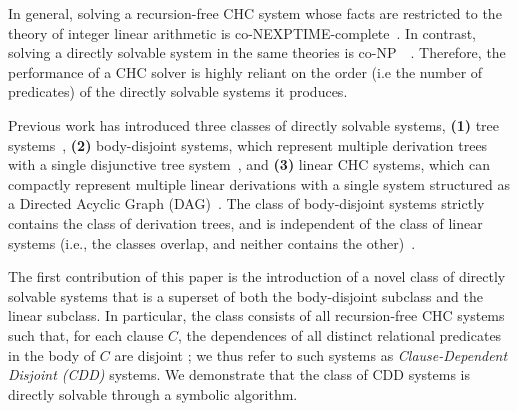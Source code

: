 In general, solving a recursion-free CHC system whose facts are
restricted to the theory of integer linear arithmetic is
co-NEXPTIME-complete~\cite{rummer13b}.
%
In contrast, solving a directly solvable system in the same theories
is co-NP~~\cite{rummer13b}.
%
Therefore, the performance of a CHC solver is highly reliant on the
order (i.e the number of predicates) of the directly solvable systems
it produces.

\begin{figure}

\end{figure}

Previous work has introduced three classes of directly solvable
systems,
\textbf{(1)} tree systems~\cite{heizmann10,bjorner13,mcmillan14}, %
\textbf{(2)} body-disjoint systems, which represent multiple
derivation trees with a single disjunctive tree
system~\cite{rummer13a,rummer13b}, and
\textbf{(3)} linear CHC systems, which can compactly represent
multiple linear derivations with a single system structured as a
Directed Acyclic Graph (DAG)~\cite{albarghouthi12a}.
%
The class of body-disjoint systems strictly contains the class of
derivation trees, and is independent of the class of linear systems
(i.e., the classes overlap, and neither contains the
other)~\cite{rummer13a,rummer13b}.

The first contribution of this paper is the introduction of a novel
class of directly solvable systems that is a superset of both
the body-disjoint subclass and the linear subclass.
%
In particular, the class consists of all recursion-free CHC systems
such that, for each clause $C$, the dependences of all distinct
relational predicates in the body of $C$ are disjoint ;
%
we thus refer to such systems as \emph{Clause-Dependent Disjoint
(CDD)} systems.
%
We demonstrate that the class of CDD systems is directly solvable
through a symbolic algorithm.
%

